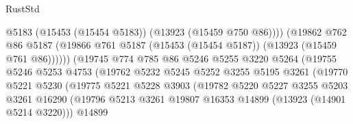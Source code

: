\begin{lexlean}{RustStd}
\begin{coremodule}
                                          @5183
                                          (@15453 (@15454 @5183))
                                          (@13923 (@15459 @750 @86))))
                                      (@19862
                                        @762
                                        @86
                                        @5187
                                        (@19866
                                          @761
                                          @5187
                                          (@15453 (@15454 @5187))
                                          (@13923 (@15459 @761 @86))))))
                                  (@19745
                                    @774
                                    @785
                                    @86
                                    @5246
                                    @5255
                                    @3220
                                    @5264
                                    (@19755
                                      @5246
                                      @5253
                                      @4753
                                      (@19762
                                        @5232
                                        @5245
                                        @5252
                                        @3255
                                        @5195
                                        @3261
                                        (@19770
                                          @5221
                                          @5230
                                          (@19775
                                            @5221
                                            @5228
                                            @3903
                                            (@19782
                                              @5220
                                              @5227
                                              @3255
                                              @5203
                                              @3261
                                              @16290
                                              (@19796
                                                @5213
                                                @3261
                                                @19807
                                                @16353
                                                @14899
                                                (@13923 (@14901 @5214 @3220)))
                                              @14899

\end{coremodule}
\end{lexlean}
